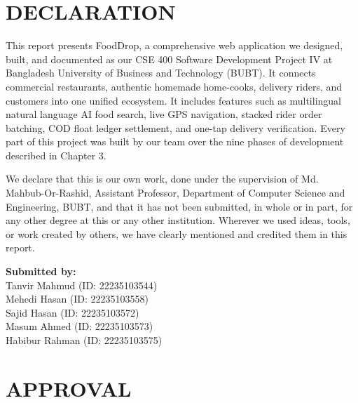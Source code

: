 \documentclass[12pt,a4paper]{report}
\begin{document}
\setcounter{page}{2}

\chapter*{DECLARATION}

This report presents FoodDrop, a comprehensive web application we designed, built, and documented as our CSE 400 Software Development Project IV at Bangladesh University of Business and Technology (BUBT). It connects commercial restaurants, authentic homemade home-cooks, delivery riders, and customers into one unified ecosystem. It includes features such as multilingual natural language AI food search, live GPS navigation, stacked rider order batching, COD float ledger settlement, and one-tap delivery verification. Every part of this project was built by our team over the nine phases of development described in Chapter 3.

We declare that this is our own work, done under the supervision of Md. Mahbub-Or-Rashid, Assistant Professor, Department of Computer Science and Engineering, BUBT, and that it has not been submitted, in whole or in part, for any other degree at this or any other institution. Wherever we used ideas, tools, or work created by others, we have clearly mentioned and credited them in this report.

\vspace{1.5cm}
\textbf{Submitted by:}\\[0.3cm]
Tanvir Mahmud (ID: 22235103544)\\
Mehedi Hasan (ID: 22235103558)\\
Sajid Hasan (ID: 22235103572)\\
Masum Ahmed (ID: 22235103573)\\
Habibur Rahman (ID: 22235103575)

\newpage

\chapter*{APPROVAL}
\end{document}
